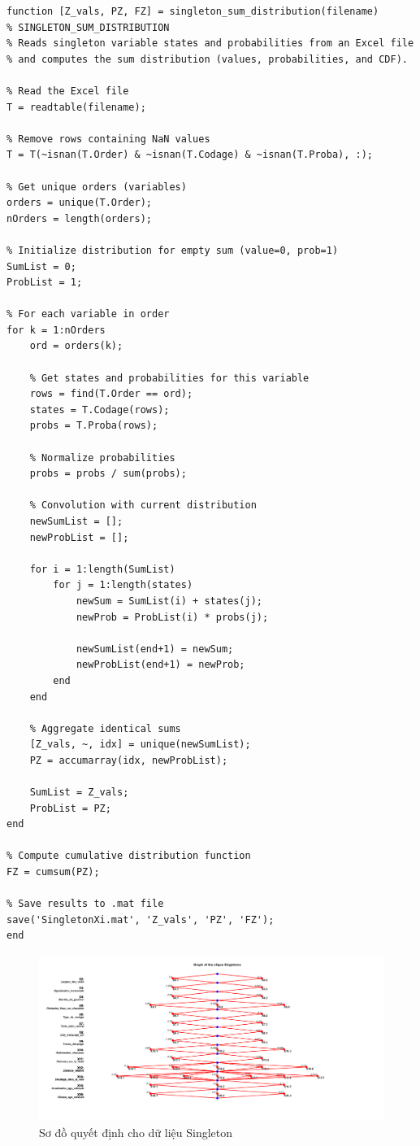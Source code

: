 \begin{matlab}
\begin{lstlisting}
function [Z_vals, PZ, FZ] = singleton_sum_distribution(filename)
% SINGLETON_SUM_DISTRIBUTION
% Reads singleton variable states and probabilities from an Excel file
% and computes the sum distribution (values, probabilities, and CDF).

% Read the Excel file
T = readtable(filename);

% Remove rows containing NaN values
T = T(~isnan(T.Order) & ~isnan(T.Codage) & ~isnan(T.Proba), :);

% Get unique orders (variables)
orders = unique(T.Order);
nOrders = length(orders);

% Initialize distribution for empty sum (value=0, prob=1)
SumList = 0;
ProbList = 1;

% For each variable in order
for k = 1:nOrders
    ord = orders(k);
    
    % Get states and probabilities for this variable
    rows = find(T.Order == ord);
    states = T.Codage(rows);
    probs = T.Proba(rows);
    
    % Normalize probabilities
    probs = probs / sum(probs);
    
    % Convolution with current distribution
    newSumList = [];
    newProbList = [];
    
    for i = 1:length(SumList)
        for j = 1:length(states)
            newSum = SumList(i) + states(j);
            newProb = ProbList(i) * probs(j);
            
            newSumList(end+1) = newSum;
            newProbList(end+1) = newProb;
        end
    end
    
    % Aggregate identical sums
    [Z_vals, ~, idx] = unique(newSumList);
    PZ = accumarray(idx, newProbList);
    
    SumList = Z_vals;
    ProbList = PZ;
end

% Compute cumulative distribution function
FZ = cumsum(PZ);

% Save results to .mat file
save('SingletonXi.mat', 'Z_vals', 'PZ', 'FZ');
end
\end{lstlisting}
\end{matlab}

\begin{figure}[h!]
    \centering
    \includegraphics[width=0.8\linewidth]{../../assets/images/fig_Singletons.png}
    \caption{Sơ đồ quyết định cho dữ liệu Singleton}
\end{figure}

